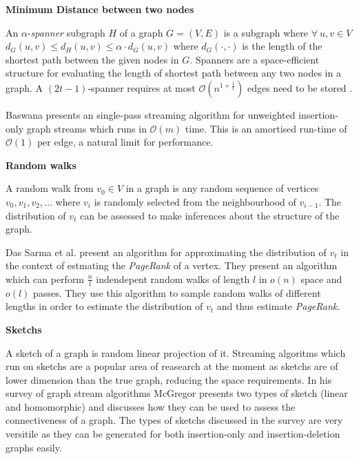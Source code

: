 \documentclass[11pt,twoside,a4paper]{report}
\begin{document}
\par\noindent\textbf{Minimum Distance between two nodes}
\par An $\alpha$-\textit{spanner} subgraph $H$ of a graph $G=(V,E)$ is a subgraph where $\forall\ u,v\in V$ $d_G(u,v)\leq d_H(u,v)\leq\alpha\cdot d_G(u,v)$ where $d_G(\cdot,\cdot)$ is the length of the shortest path between the given nodes in $G$. Spanners are a space-efficient structure for evaluating the length of shortest path between any two nodes in a graph. A $(2t-1)$-spanner requires at most $\mathcal{O}(n^{1+\frac1t})$ edges need to be stored \cite{edgesOfSpanner}.
\par Baswana \cite{spanner} presents an single-pass streaming algorithm for unweighted insertion-only graph streams which runs in $\mathcal{O}(m)$ time. This is an amortised run-time of $\mathcal{O}(1)$ per edge, a natural limit for performance.\newline

\par\noindent\textbf{Random walks}
\par A random walk from $v_0\in V$ in a graph is any random sequence of vertices $v_0,v_1,v_2,\dots$ where $v_i$ is randomly selected from the neighbourhood of $v_{i-1}$. The distribution of $v_t$ can be assessed to make inferences about the structure of the graph.
\par Das Sarma et al. \cite{RandomWalks} present an algorithm for approximating the distribution of $v_t$ in the context of estmating the \textit{PageRank} of a vertex. They present an algorithm which can perform $\frac{n}{l}$ indendepent random walks of length $l$ in $o(n)$ space and $o(l)$ passes. They use this algorithm to sample random walks of different lengths in order to estimate the distribution of $v_t$ and thus estimate \textit{PageRank}.\newline

\par\noindent\textbf{Sketchs}
\par A sketch of a graph is random linear projection of it. Streaming algoritms which run on sketchs are a popular area of reasearch at the moment as sketchs are of lower dimension than the true graph, reducing the space requirements. In his survey of graph stream algorithms \cite{GraphStreamSurvey} McGregor presents two types of sketch (linear and homomorphic) and discusses how they can be used to assess the connectiveness of a graph. The types of sketchs discussed in the survey are very versitile as they can be generated for both insertion-only and insertion-deletion graphs easily.
\end{document}
